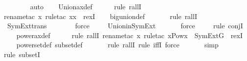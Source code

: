 \begin{isabellebody}
\ \ \ \ \ \ \isamarkupfalse%
\ auto{\isacharbrackleft}{\kern0pt}{}{\isacharbrackright}{\kern0pt}\isanewline
\ \ \isamarkupfalse%
\ Union{\isacharunderscore}{\kern0pt}ax{\isacharunderscore}{\kern0pt}def\ \isanewline
\ \ \ \ \isamarkupfalse%
{\isacharparenleft}{\kern0pt}rule\ rallI{\isacharparenright}{\kern0pt}\isanewline
\ \ \ \ \isamarkupfalse%
{\isacharparenleft}{\kern0pt}rename{\isacharunderscore}{\kern0pt}tac\ x{\isacharcomma}{\kern0pt}\ rule{\isacharunderscore}{\kern0pt}tac\ x{\isacharequal}{\kern0pt}{\isachardoublequoteopen}{\isasymUnion}x{\isachardoublequoteclose}\ \ rexI{\isacharparenright}{\kern0pt}\isanewline
\ \ \isamarkupfalse%
\ big{\isacharunderscore}{\kern0pt}union{\isacharunderscore}{\kern0pt}def\ \isanewline
\ \ \ \ \ \isamarkupfalse%
{\isacharparenleft}{\kern0pt}rule\ rallI{\isacharparenright}{\kern0pt}\isanewline
\ \ \isamarkupfalse%
\ SymExt{\isacharunderscore}{\kern0pt}trans\ \isanewline
\ \ \ \ \ \isamarkupfalse%
\ force\ \isanewline
\ \ \isamarkupfalse%
\ Union{\isacharunderscore}{\kern0pt}in{\isacharunderscore}{\kern0pt}SymExt\ \isanewline
\ \ \ \ \isamarkupfalse%
\ force\ \isanewline
\ \ \ \isamarkupfalse%
{\isacharparenleft}{\kern0pt}rule\ conjI{\isacharparenright}{\kern0pt}\isanewline
\ \ \isamarkupfalse%
\ power{\isacharunderscore}{\kern0pt}ax{\isacharunderscore}{\kern0pt}def\ \isanewline
\ \ \ \ \isamarkupfalse%
{\isacharparenleft}{\kern0pt}rule\ rallI{\isacharcomma}{\kern0pt}\ rename{\isacharunderscore}{\kern0pt}tac\ x{\isacharcomma}{\kern0pt}\ rule{\isacharunderscore}{\kern0pt}tac\ x{\isacharequal}{\kern0pt}{\isachardoublequoteopen}Pow{\isacharparenleft}{\kern0pt}x{\isacharparenright}{\kern0pt}\ {\isasyminter}\ SymExt{\isacharparenleft}{\kern0pt}G{\isacharparenright}{\kern0pt}{\isachardoublequoteclose}\ \ rexI{\isacharparenright}{\kern0pt}\isanewline
\ \ \isamarkupfalse%
\ powerset{\isacharunderscore}{\kern0pt}def\ subset{\isacharunderscore}{\kern0pt}def\ \isanewline
\ \ \ \ \ \isamarkupfalse%
{\isacharparenleft}{\kern0pt}rule\ rallI{\isacharcomma}{\kern0pt}\ rule\ iffI{\isacharcomma}{\kern0pt}\ force{\isacharparenright}{\kern0pt}\isanewline
\ \ \ \ \ \isamarkupfalse%
\ simp\isanewline
\ \ \ \ \ \isamarkupfalse%
{\isacharparenleft}{\kern0pt}rule\ subsetI{\isacharparenright}{\kern0pt}\isanewline

\end{isabellebody}
